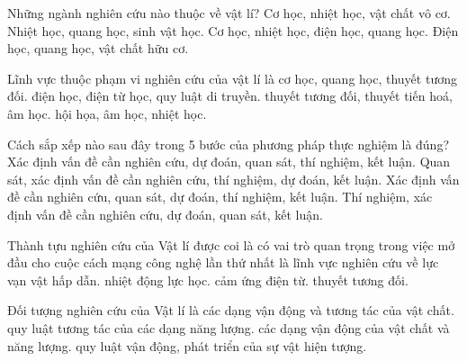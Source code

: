 \begin{ex}
Những ngành nghiên cứu nào thuộc về vật lí?
\choice
{Cơ học, nhiệt học, vật chất vô cơ.}
{Nhiệt học, quang học, sinh vật học.}
{\True Cơ học, nhiệt học, điện học, quang học.}
{Điện học, quang học, vật chất hữu cơ.}
\end{ex}

\begin{ex}
Lĩnh vực thuộc phạm vi nghiên cứu của vật lí là
\choice
{\True cơ học, quang học, thuyết tương đối.}
{điện học, điện từ học, quy luật di truyền.}
{thuyết tương đối, thuyết tiến hoá, âm học.}
{hội họa, âm học, nhiệt học.}
\end{ex}

\begin{ex}
Cách sắp xếp nào sau đây trong 5 bước của phương pháp thực nghiệm là đúng?
\choice
{Xác định vấn đề cần nghiên cứu, dự đoán, quan sát, thí nghiệm, kết luận.}
{Quan sát, xác định vấn đề cần nghiên cứu, thí nghiệm, dự đoán, kết luận.}
{\True Xác định vấn đề cần nghiên cứu, quan sát, dự đoán, thí nghiệm, kết luận.}
{Thí nghiệm, xác định vấn đề cần nghiên cứu, dự đoán, quan sát, kết luận.}
\end{ex}

\begin{ex}
Thành tựu nghiên cứu của Vật lí được coi là có vai trò quan trọng trong việc mở đầu cho cuộc cách mạng công nghệ lần thứ nhất là lĩnh vực nghiên cứu về
\choice
{lực vạn vật hấp dẫn.}
{\True nhiệt động lực học.}
{cảm ứng điện từ.}
{thuyết tương đối.}
\end{ex}

\begin{ex}
Đối tượng nghiên cứu của Vật lí là
\choice
{các dạng vận động và tương tác của vật chất.}
{quy luật tương tác của các dạng năng lượng.}
{\True các dạng vận động của vật chất và năng lượng.}
{quy luật vận động, phát triển của sự vật hiện tượng.}
\end{ex}

